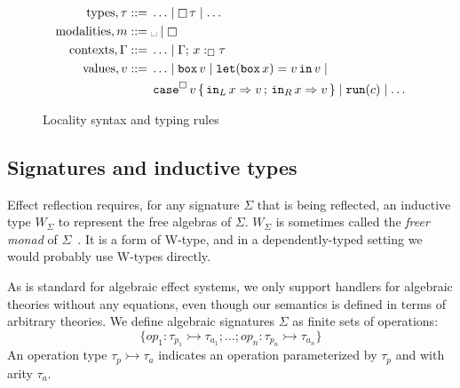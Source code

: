 \documentclass[acmsmall, screen, review, anonymous]{acmart}
\theoremstyle{definition}
\newcommand{\glob}{\mathop{\Box}}
\newcommand{\nothing}{\text{\textvisiblespace}}
\newcommand{\ind}[1]{W_{#1}}
\newcommand{\seq}{\,;\,}
\newcommand{\inlname}{\mathop{\mathtt{in}_L}}
\newcommand{\inl}[1]{\inlname #1}
\newcommand{\inrname}{\mathop{\mathtt{in}_R}}
\newcommand{\inr}[1]{\inrname #1}
\newcommand{\casename}{\mathtt{case}}
\newcommand{\casemname}{\casename^{m}}
\newcommand{\casem}[5]{\mathop{\casemname} #1 \,\{\,\inl{#2} \Rightarrow #3 \seq \inr{#4} \Rightarrow #5 \,\}}
\newcommand{\caseboxname}{\casename^{\Box}}
\newcommand{\casebox}[5]{\mathop{\caseboxname} #1 \,\{\,\inl{#2} \Rightarrow #3 \seq \inr{#4} \Rightarrow #5 \,\}}
\newcommand{\types}{\mathrel{:}}
\newcommand{\gtypes}{\mathrel{:_{\Box}}}
\newcommand{\mtypes}{\mathrel{:_{m}}}
\newcommand{\ccons}[2]{#1;\,#2}
\newcommand{\mbind}[3]{\ccons{#1}{#2\mtypes#3}}
\newcommand{\gbind}[3]{\ccons{#1}{#2\gtypes#3}}
\newcommand{\cdiv}[1]{#1/\Box}
\newcommand{\cmdiv}[1]{#1/m}
\newcommand{\gboxname}{\mathop{\mathtt{box}}}
\newcommand{\gbox}[1]{\gboxname #1}
\newcommand{\gunbox}[3]{\mathop{\mathtt{let}} (\gbox{#1}) = #2 \mathop{\mathtt{in}} #3}
\newcommand{\grunname}{\mathtt{run}}
\newcommand{\grun}[1]{\mathop{\grunname}(#1)}
\newcommand{\turnv}{\mathrel{\vdash_V}}
\newcommand{\turnc}{\mathrel{\vdash_C}}
\begin{document}
\begin{figure}
\begin{align*}
  \mathrm{types}, \tau ::=\;& \ldots \mid \glob \tau \mid \ldots \\
  \mathrm{modalities}, m ::=\;& \nothing \mid \glob \\
  \mathrm{contexts}, \Gamma ::=\;& \ldots \mid \gbind{\Gamma}{x}{\tau} \\
  \mathrm{values}, v ::=\;& \ldots \mid \gbox{v} \mid \gunbox{x}{v}{v} \mid \\
                          &\casebox{v}{x}{v}{x}{v} \mid \grun{c} \mid \ldots
\end{align*}
\caption{Locality syntax and typing rules}
\label{fig:typing-locality}
\end{figure}

\subsection{Signatures and inductive types}
\label{sec:signatures}

Effect reflection requires, for any signature $\Sigma$ that is being
reflected, an inductive type $\ind{\Sigma}$ to represent the free
algebras of $\Sigma$. $\ind{\Sigma}$ is sometimes called the \emph{freer
  monad} of $\Sigma$~\cite{kiselyov2015freer}. It is a form of
W-type, and in a dependently-typed setting we would probably use W-types
directly.

As is standard for algebraic effect systems, we only support handlers
for algebraic theories without any equations, even though our semantics
is defined in terms of arbitrary theories. We define algebraic
signatures $\Sigma$ as finite sets of operations:
\begin{equation*}
\{ op_1 \types \tau_{p_1} \rightarrowtail \tau_{a_1}; \ldots; op_n
\types \tau_{p_n} \rightarrowtail \tau_{a_n} \}
\end{equation*}
An operation type $\tau_p \rightarrowtail \tau_a$ indicates an operation
parameterized by $\tau_p$ and with arity $\tau_a$.
\end{document}
